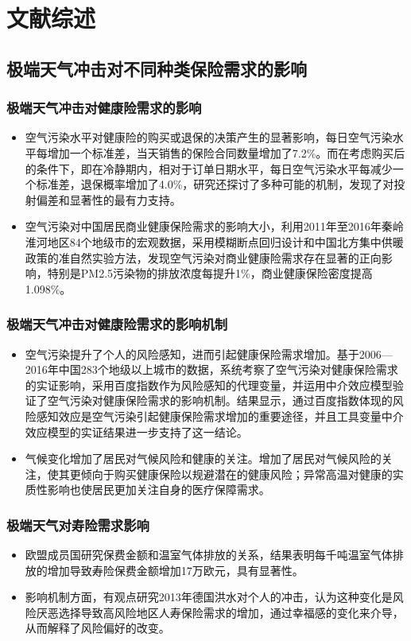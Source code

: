 \documentclass[a4paper,12pt]{ctexbeamer}
\begin{document}
\section{文献综述}

\subsection{极端天气冲击对不同种类保险需求的影响}
\begin{frame}
    \frametitle{极端天气冲击对健康险需求的影响}
    \begin{itemize}
        \item 空气污染水平对健康险的购买或退保的决策产生的显著影响\citep{2018Something}，每日空气污染水平每增加一个标准差，当天销售的保险合同数量增加了7.2\%。而在考虑购买后的条件下，即在冷静期内，相对于订单日期水平，每日空气污染水平每减少一个标准差，退保概率增加了4.0\%，研究还探讨了多种可能的机制，发现了对投射偏差和显著性的最有力支持。
        \item 空气污染对中国居民商业健康保险需求的影响大小\citep{赵强2021空气污染对商业健康保险需求的影响}，利用2011年至2016年秦岭淮河地区84个地级市的宏观数据，采用模糊断点回归设计和中国北方集中供暖政策的准自然实验方法，发现空气污染对商业健康险需求存在显著的正向影响，特别是PM2.5污染物的排放浓度每提升1\%，商业健康保险密度提高1.098\%。
    \end{itemize}
\end{frame}
\begin{frame}
    \frametitle{极端天气冲击对健康险需求的影响机制}
    \begin{itemize}
        \item 空气污染提升了个人的风险感知，进而引起健康保险需求增加\citep{宋平凡2022空气污染}。基于2006—2016年中国283个地级以上城市的数据，系统考察了空气污染对健康保险需求的实证影响，采用百度指数作为风险感知的代理变量，并运用中介效应模型验证了空气污染对健康保险需求的影响机制。结果显示，通过百度指数体现的风险感知效应是空气污染引起健康保险需求增加的重要途径，并且工具变量中介效应模型的实证结果进一步支持了这一结论。
        \item 气候变化增加了居民对气候风险和健康的关注\cite{zhong2022exposure}。增加了居民对气候风险的关注，使其更倾向于购买健康保险以规避潜在的健康风险；异常高温对健康的实质性影响也使居民更加关注自身的医疗保障需求。
    \end{itemize}
\end{frame}

\begin{frame}
    \frametitle{极端天气对寿险需求影响}
    \begin{itemize}
        \item 欧盟成员国研究保费金额和温室气体排放的关系\citep{melnychenko2021influence}，结果表明每千吨温室气体排放的增加导致寿险保费金额增加17万欧元，具有显著性。
        \item 影响机制方面，有观点研究2013年德国洪水对个人的冲击\citep{avdeenko2021impact}，认为这种变化是风险厌恶选择导致高风险地区人寿保险需求的增加，通过幸福感的变化来介导，从而解释了风险偏好的改变。
    \end{itemize}
\end{frame}
\end{document}
